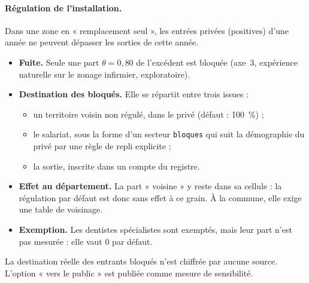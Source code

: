 \documentclass[11pt]{article}
\begin{document}
\paragraph{Régulation de l'installation.} Dans une zone en « remplacement seul », les entrées
privées (positives) d'une année ne peuvent dépasser les sorties de cette année.
\begin{itemize}
  \item \textbf{Fuite.} Seule une part $\theta = 0{,}80$\suppose{} de l'excédent est bloquée (axe~3,
        expérience naturelle sur le zonage infirmier, exploratoire).
  \item \textbf{Destination des bloqués.} Elle se répartit entre trois issues :
        \begin{itemize}
          \item un territoire voisin non régulé, dans le privé (défaut : 100\suppose{}~\%) ;
          \item le salariat, sous la forme d'un secteur \texttt{bloques} qui suit la démographie du
                privé par une règle de repli explicite ;
          \item la sortie, inscrite dans un compte du registre.
        \end{itemize}
  \item \textbf{Effet au département.} La part « voisine » y reste dans sa cellule : la régulation par
        défaut est donc sans effet à ce grain. À la commune, elle exige une table de voisinage.
  \item \textbf{Exemption.} Les dentistes spécialistes sont exemptés, mais leur part n'est pas
        mesurée : elle vaut 0 par défaut.
\end{itemize}
La destination réelle des entrants bloqués n'est chiffrée par aucune source. L'option « vers le
public » est publiée comme mesure de sensibilité.
\end{document}
